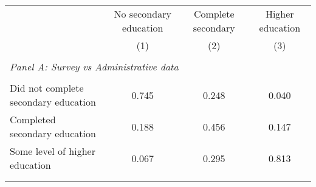 \makeatletter
{}
{
\makeatother
\begin{tabular}{lccc}
\toprule
& No secondary education & Complete secondary & Higher education \\
\cmidrule(lr){2-2} \cmidrule(lr){3-3} \cmidrule(lr){4-4} 
& (1) & (2) & (3) \\
\bottomrule
&  &  &  \\

\multicolumn{4}{l}{\textit{Panel A: Survey vs Administrative data}} \\
            &            &            &                        \\
Did not complete secondary education & 0.745 & 0.248 & 0.040 \\
Completed secondary education & 0.188 & 0.456 & 0.147 \\
Some level of higher education & 0.067 & 0.295 & 0.813 \\            
\\
            &            &            &                       \\

\bottomrule
\end{tabular}
}
